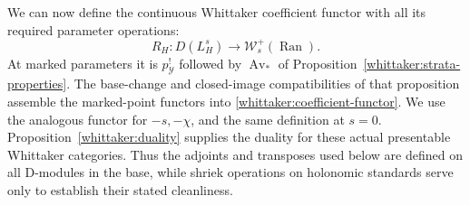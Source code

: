 We can now define the continuous Whittaker coefficient functor with all
its required parameter operations:
\begin{equation}\label{whittaker:coefficient-functor}
 R_H:D(L_H^s)\longrightarrow\mathcal W_s^+(\operatorname{Ran}).
\end{equation}
At marked parameters it is $p_{\mathcal Y}^!$ followed by
$\operatorname{Av}_*$ of Proposition~\ref{whittaker:strata-properties}.
The base-change and closed-image compatibilities of that proposition
assemble the marked-point functors into \eqref{whittaker:coefficient-functor}.
We use the analogous functor for $-s,-\chi$, and the same definition at
$s=0$. Proposition~\ref{whittaker:duality} supplies the duality for these
actual presentable Whittaker categories. Thus the adjoints and transposes
used below are defined on all D-modules in the base, while shriek
operations on holonomic standards serve only to establish their stated
cleanliness.
